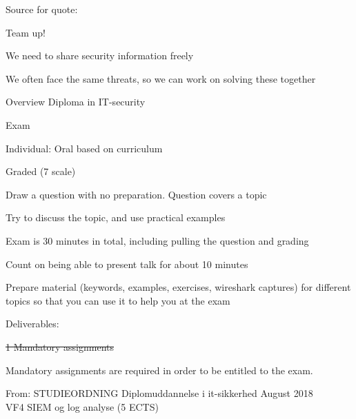 \documentclass[Screen16to9,17pt]{foils}
\begin{document}
Source for quote: 



\begin{list1}
\item Team up!
\item We need to share security information freely
\item We often face the same threats, so we can work on solving these together
\end{list1}







\hskip 7cm Overview Diploma in IT-security




\begin{list2}
\item Exam
\item Individual: Oral based on curriculum
\item Graded (7 scale)
\item Draw a question with no preparation. Question covers a topic
\item Try to discuss the topic, and use practical examples
\item Exam is 30 minutes in total, including pulling the question and grading
\item Count on being able to present talk for about 10 minutes
\item Prepare material (keywords, examples, exercises, wireshark captures) for different topics so that you can use it to help you at the exam

\vskip 5mm
\item Deliverables:
\item \sout{1 Mandatory assignments}
\item Mandatory assignments are required in order to be entitled to the exam.
\end{list2}





From: STUDIEORDNING Diplomuddannelse i it-sikkerhed August 2018\\
VF4 SIEM og log analyse (5 ECTS)
\end{document}
